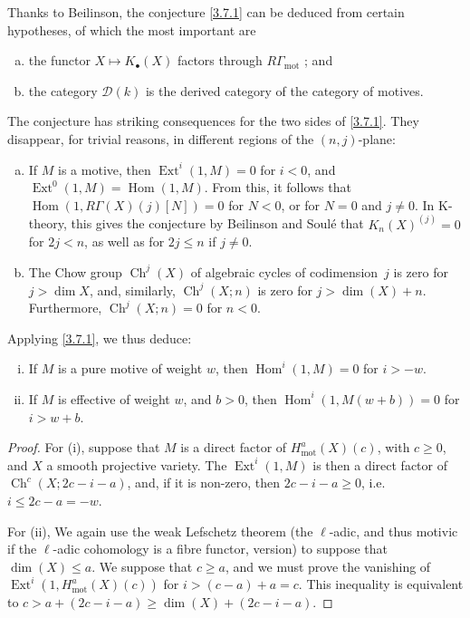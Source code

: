 \documentclass{article}
\theoremstyle{plain}
\newenvironment{nullities}[1]
  {\renewcommand\theinnercustomnullities{#1}\innercustomnullities}
  {\endinnercustomnullities}
\theoremstyle{definition}
\newcommand{\sh}[1]{{\mathscr{#1}}}
\newcommand{\mot}{\mathrm{mot}}
\renewcommand{\geq}{\geqslant}
\renewcommand{\leq}{\leqslant}
\DeclareMathOperator{\Hom}{Hom}
\DeclareMathOperator{\Ext}{Ext}
\DeclareMathOperator{\Ch}{Ch}
\begin{document}
Thanks to Beilinson, the conjecture \cref{3.7.1} can be deduced from certain hypotheses, of which the most important are
\begin{enumerate}[(a)]
  \item the functor $X\mapsto K_\bullet(X)$ factors through $R\Gamma_\mot$ ; and
  \item the category $\sh{D}(k)$ is the derived category of the category of motives.
\end{enumerate}
The conjecture has striking consequences for the two sides of \cref{3.7.1}.
They disappear, for trivial reasons, in different regions of the $(n,j)$-plane:
\begin{enumerate}[(a)]
  \item If $M$ is a motive, then $\Ext^i(1,M)=0$ for $i<0$, and $\Ext^0(1,M)=\Hom(1,M)$.
    From this, it follows that $\Hom(1,R\Gamma(X)(j)[N])=0$ for $N<0$, or for $N=0$ and $j\neq0$.
    In K-theory, this gives the conjecture by Beilinson and Soul\'{e} that $K_n(X)^{(j)}=0$ for $2j<n$, as well as for $2j\leq n$ if $j\neq0$.
  \item The Chow group $\Ch^j(X)$ of algebraic cycles of codimension~$j$ is zero for $j>\dim X$, and, similarly, $\Ch^j(X;n)$ is zero for $j>\dim(X)+n$.
    Furthermore, $\Ch^j(X;n)=0$ for $n<0$.
\end{enumerate}
Applying \cref{3.7.1}, we thus deduce:

\begin{nullities}{3.8.1}
\label{3.8.1}
  \begin{enumerate}[(i)]
    \item If $M$ is a pure motive of weight $w$, then $\Hom^i(1,M)=0$ for $i>-w$.
    \item If $M$ is effective of weight $w$, and $b>0$, then $\Hom^i(1,M(w+b))=0$ for $i>w+b$.
  \end{enumerate}
\end{nullities}

\begin{proof}
  For (i), suppose that $M$ is a direct factor of $H_\mot^a(X)(c)$, with $c\geq0$, and $X$ a smooth projective variety.
  The $\Ext^i(1,M)$ is then a direct factor of $\Ch^c(X;2c-i-a)$, and, if it is non-zero, then $2c-i-a\geq0$, i.e. $i\leq 2c-a=-w$.

  For (ii), We again use the weak Lefschetz theorem (the $\ell$-adic, and thus motivic if the $\ell$-adic cohomology is a fibre functor, version) to suppose that $\dim(X)\leq a$.
  We suppose that $c\geq a$, and we must prove the vanishing of $\Ext^i(1,H_\mot^a(X)(c))$ for $i>(c-a)+a=c$.
  This inequality is equivalent to $c>a+(2c-i-a)\geq\dim(X)+(2c-i-a)$.
\end{proof}
\end{document}
